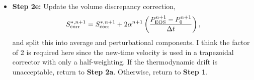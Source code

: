 \documentclass[final]{siamltex}
\def\Fb {{\bf F}}
\def\vb {{\bf v}}
\def\wb {{\bf w}}
\def\Hext {H_{\rm ext}}
\def\half   {\frac{1}{2}}
\begin{document}
\begin{itemize}
\begin{eqnarray}
&&\hspace{-1in} + \half\sum_k\nabla\cdot h_k^n \Fb_k^n + \half\sum_k\nabla\cdot h_k^{n+1,l} \Fb_k^{n+1,l}\nonumber\\
&&\hspace{-1in} + \half(\rho\Hext)^n + \half(\rho\Hext)^{n+1},
\end{eqnarray}
\begin{eqnarray}
\left(\frac{\rho^{n+1}c_p^{n+1,l}}{\Delta t} - \nabla\cdot\frac{1}{2}\lambda^{n+1,l}\nabla\right)\delta T &=& \frac{(\rho h)^n - \rho^{n+1}h^{n+1,l}}{\Delta t}\nonumber\\
&&\hspace{-1.25in} + \half\left[-\nabla\cdot(\rho h\vb)^n - \nabla\cdot(\rho h\vb)^{*,n+1} + \frac{\bar{S}^n + \bar{S}_{\rm corr}^n}{\bar{\alpha}^n} + \frac{\bar{S}^{*,n+1} + \bar{S}_{\rm corr}^{*,n+1}}{\bar{\alpha}^{*,n+1}}\right]\nonumber\\
&&\hspace{-1.25in} + \half\nabla\cdot\lambda^n\nabla T^n + \half\nabla\cdot\lambda^{n+1,l}\nabla T^{n+1,l}\nonumber\\
&&\hspace{-1.25in} + \half\sum_k\nabla\cdot h_k^n \Fb_k^n + \half\sum_k\nabla\cdot h_k^{n+1,l} \Fb_k^{n+1,l}\nonumber\\
&&\hspace{-1.25in} + \half(\rho\Hext)^n + \half(\rho\Hext)^{n+1}.
\end{eqnarray}
{\bf Step 2d-3:} Update the temperature and enthalpy using
\begin{equation}
T^{n+1,l+1} = T^{n+1,l} + \delta T, \quad h^{n+1,l+1} = h(\wb^{n+1},T^{n+1,l+1}).
\end{equation}
If $l=l_{\rm max}$, set $(h,T)^{n+1} = (h,T)^{n+1,l+1}$ and proceed to {\bf Step 2e}.\\
\item {\bf Step 2e:} Update the volume discrepancy correction,
\begin{equation}
S_{\rm corr}^{*,n+1} = S_{\rm corr}^{*,n+1} + 2\alpha^{n+1}\left(\frac{P_{\rm EOS}^{n+1} - P_0^{n+1}}{\Delta t}\right),
\end{equation}
and split this into average and perturbational components.
I think the factor of 2 is required here since the new-time
velocity is used in a trapezoidal corrector with only a half-weighting.
If the thermodynamic drift is unacceptable, return to {\bf Step 2a}.
Otherwise, return to {\bf Step 1}.\\
\end{itemize}
\end{document}
